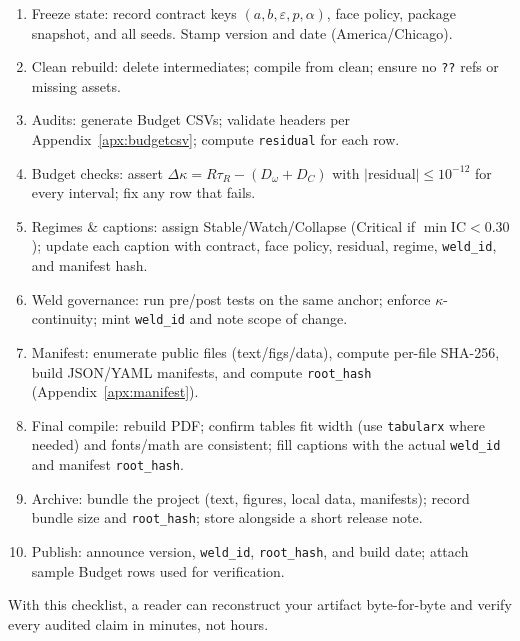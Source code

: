 \begin{tcolorbox}[umcpbox,title=/release]
\small\raggedright
\begin{enumerate}[label=\textbf{/step~\arabic*:},labelwidth=5.8em,labelsep=0.5em,
  leftmargin=6.3em,itemsep=2pt,topsep=2pt,parsep=0pt]
  \item Freeze state: record contract keys $(a,b,\varepsilon,p,\alpha)$, face policy, package snapshot, and all seeds. Stamp version and date (America/Chicago).
  \item Clean rebuild: delete intermediates; compile from clean; ensure no \texttt{??} refs or missing assets.
  \item Audits: generate Budget CSVs; validate headers per Appendix~\ref{apx:budgetcsv}; compute \texttt{residual} for each row.
  \item Budget checks: assert $\Delta\kappa = R\tau_{R}-(D_{\omega}+D_{C})$ with $|\text{residual}|\le 10^{-12}$ for every interval; fix any row that fails.
  \item Regimes \& captions: assign Stable/Watch/Collapse (Critical if $\min\mathrm{IC}<0.30$); update each caption with contract, face policy, residual, regime, \texttt{weld\_id}, and manifest hash.
  \item Weld governance: run pre/post tests on the same anchor; enforce $\kappa$-continuity; mint \texttt{weld\_id} and note scope of change.
  \item Manifest: enumerate public files (text/figs/data), compute per-file SHA-256, build JSON/YAML manifests, and compute \texttt{root\_hash} (Appendix~\ref{apx:manifest}).
  \item Final compile: rebuild PDF; confirm tables fit width (use \texttt{tabularx} where needed) and fonts/math are consistent; fill captions with the actual \texttt{weld\_id} and manifest \texttt{root\_hash}.
  \item Archive: bundle the project (text, figures, local data, manifests); record bundle size and \texttt{root\_hash}; store alongside a short release note.
  \item Publish: announce version, \texttt{weld\_id}, \texttt{root\_hash}, and build date; attach sample Budget rows used for verification.
\end{enumerate}
\end{tcolorbox}


\medskip
With this checklist, a reader can reconstruct your artifact byte-for-byte and verify every audited claim in minutes, not hours.
